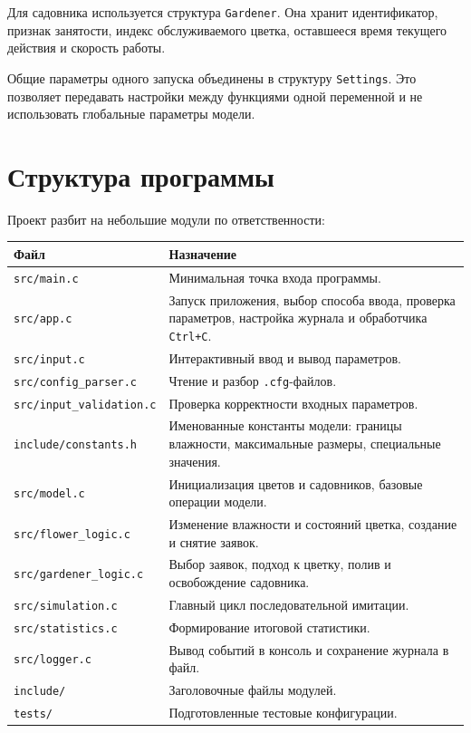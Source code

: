 \documentclass[12pt,a4paper]{article}
\begin{document}
Для садовника используется структура \texttt{Gardener}. Она хранит идентификатор,
признак занятости, индекс обслуживаемого цветка, оставшееся время текущего
действия и скорость работы.

Общие параметры одного запуска объединены в структуру \texttt{Settings}.
Это позволяет передавать настройки между функциями одной переменной и не
использовать глобальные параметры модели.

\section{Структура программы}

Проект разбит на небольшие модули по ответственности:

\begin{longtable}{|>{\raggedright\arraybackslash}p{4cm}|p{10cm}|}
\hline
\textbf{Файл} & \textbf{Назначение} \\
\hline
\texttt{src/main.c} & Минимальная точка входа программы. \\
\texttt{src/app.c} & Запуск приложения, выбор способа ввода, проверка параметров, настройка журнала и обработчика \texttt{Ctrl+C}. \\
\hline
\texttt{src/input.c} & Интерактивный ввод и вывод параметров. \\\texttt{src/config\_parser.c} & Чтение и разбор \texttt{.cfg}-файлов. \\\texttt{src/input\_validation.c} & Проверка корректности входных параметров. \\
\hline
\texttt{include/constants.h} & Именованные константы модели: границы влажности, максимальные размеры, специальные значения. \\
\texttt{src/model.c} & Инициализация цветов и садовников, базовые операции модели. \\
\hline
\texttt{src/flower\_logic.c} & Изменение влажности и состояний цветка, создание и снятие заявок. \\
\hline
\texttt{src/gardener\_logic.c} & Выбор заявок, подход к цветку, полив и освобождение садовника. \\
\hline
\texttt{src/simulation.c} & Главный цикл последовательной имитации. \\
\hline
\texttt{src/statistics.c} & Формирование итоговой статистики. \\
\hline
\texttt{src/logger.c} & Вывод событий в консоль и сохранение журнала в файл. \\
\hline
\texttt{include/} & Заголовочные файлы модулей. \\
\hline
\texttt{tests/} & Подготовленные тестовые конфигурации. \\
\hline
\end{longtable}
\end{document}
